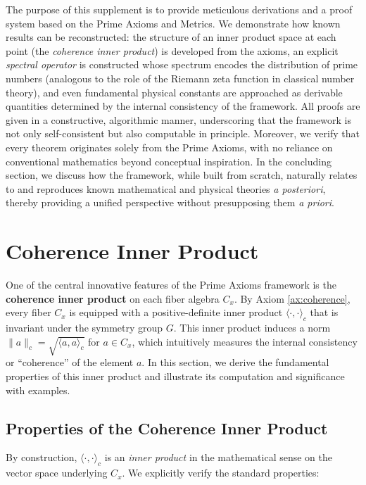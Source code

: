 \documentclass[11pt]{article}
\begin{document}
The purpose of this supplement is to provide meticulous derivations and a proof system based on the Prime Axioms and Metrics. We demonstrate how known results can be reconstructed: the structure of an inner product space at each point (the \emph{coherence inner product}) is developed from the axioms, an explicit \emph{spectral operator} is constructed whose spectrum encodes the distribution of prime numbers (analogous to the role of the Riemann zeta function in classical number theory), and even fundamental physical constants are approached as derivable quantities determined by the internal consistency of the framework. All proofs are given in a constructive, algorithmic manner, underscoring that the framework is not only self-consistent but also computable in principle. Moreover, we verify that every theorem originates solely from the Prime Axioms, with no reliance on conventional mathematics beyond conceptual inspiration. In the concluding section, we discuss how the framework, while built from scratch, naturally relates to and reproduces known mathematical and physical theories \emph{a posteriori}, thereby providing a unified perspective without presupposing them \emph{a priori}.

\section{Coherence Inner Product}

One of the central innovative features of the Prime Axioms framework is the \textbf{coherence inner product} on each fiber algebra $C_x$. By Axiom \ref{ax:coherence}, every fiber $C_x$ is equipped with a positive-definite inner product $\langle\cdot,\cdot\rangle_c$ that is invariant under the symmetry group $G$. This inner product induces a norm $\|a\|_c = \sqrt{\langle a, a\rangle_c}$ for $a\in C_x$, which intuitively measures the internal consistency or ``coherence'' of the element $a$. In this section, we derive the fundamental properties of this inner product and illustrate its computation and significance with examples.

\subsection*{Properties of the Coherence Inner Product}

By construction, $\langle\cdot,\cdot\rangle_c$ is an \emph{inner product} in the mathematical sense on the vector space underlying $C_x$. We explicitly verify the standard properties:
\end{document}
